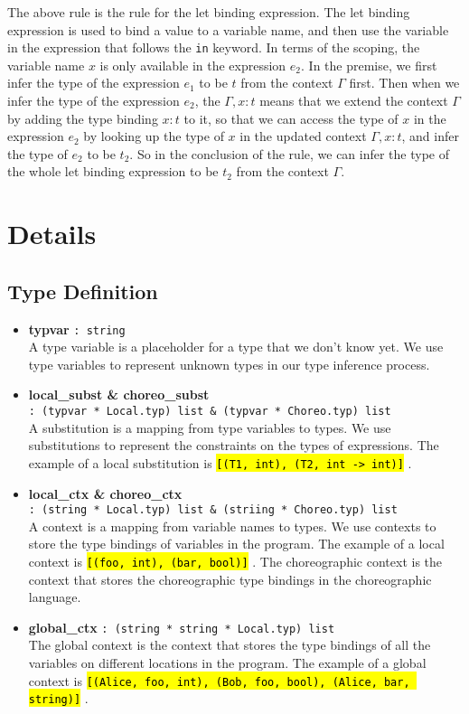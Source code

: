 \documentclass{article}
\newcommand{\highlighttexttt}[2][black]{ %
  \sethlcolor{cyan!10} %
  \texttt{\textcolor{#1}{\hl{#2}}}
}
\begin{document}
    The above rule is the rule for the let binding expression. The let binding expression is used to bind a value to a variable name,
    and then use the variable in the expression that follows the \texttt{in} keyword.
    In terms of the scoping, the variable name $x$ is only available in the expression $e_2$.
    In the premise, we first infer the type of the expression $e_1$ to be $t$ from the context $\Gamma$ first.
    Then when we infer the type of the expression $e_2$, the $\Gamma, x:t$ means that we extend the context $\Gamma$ by adding the type binding $x:t$ to it,
    so that we can access the type of $x$ in the expression $e_2$ by looking up the type of $x$ in the updated context $\Gamma, x:t$, and infer the type of $e_2$ to be $t_2$.
    So in the conclusion of the rule, we can infer the type of the whole let binding expression to be $t_2$ from the context $\Gamma$.

    \newpage %


\section{Details}
\subsection{Type Definition}
    \begin{itemize}
        \item \textbf{typvar} \texttt{: string}\\
              A type variable is a placeholder for a type that we don't know yet. We use type variables to represent unknown types in our type inference process.
        \item \textbf{local\_subst \& choreo\_subst} \\\texttt{: (typvar * Local.typ) list \& (typvar * Choreo.typ) list}\\
              A substitution is a mapping from type variables to types. We use substitutions to represent the constraints on the types of expressions.
              The example of a local substitution is \highlighttexttt{[(T1, int), (T2, int -> int)]}.
        \item \textbf{local\_ctx \& choreo\_ctx} \\\texttt{: (string * Local.typ) list \& (striing * Choreo.typ) list}\\
              A context is a mapping from variable names to types. We use contexts to store the type bindings of variables in the program.
              The example of a local context is \highlighttexttt{[(foo, int), (bar, bool)]}.
              The choreographic context is the context that stores the choreographic type bindings in the choreographic language.
        \item \textbf{global\_ctx} \texttt{: (string * string * Local.typ) list}\\
              The global context is the context that stores the type bindings of all the variables on different locations in the program.
              The example of a global context is \highlighttexttt{[(Alice, foo, int), (Bob, foo, bool), (Alice, bar, string)]}.
    \end{itemize}
\end{document}
